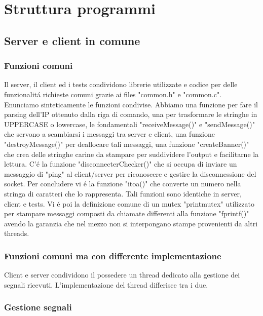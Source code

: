 \chapter{Struttura programmi}

\section{Server e client in comune}

\subsection{Funzioni comuni}

Il server, il client ed i tests condividono librerie utilizzate e codice per delle funzionalit\'a richieste comuni grazie ai files "common.h" e "common.c". 
\\
Enunciamo sinteticamente le funzioni condivise. Abbiamo una funzione per fare il parsing dell'IP ottenuto dalla riga di comando, una per trasformare le stringhe in UPPERCASE o lowercase, le fondamentali "receiveMessage()" e "sendMessage()" che servono a scambiarsi i messaggi tra server e client, una funzione "destroyMessage()" per deallocare tali messaggi, una funzione "createBanner()" che crea delle stringhe carine da stampare per suddividere l'output e facilitarne la lettura. C'\'e la funzione "disconnecterChecker()" che si occupa di inviare un messaggio di "ping" al client/server per riconoscere e gestire la disconnessione del socket. Per concludere vi \'e la funzione "itoa()" che converte un numero nella stringa di caratteri che lo rappresenta. Tali funzioni sono identiche in server, client e tests. Vi \'e poi la definizione comune di un mutex "printmutex" utilizzato per stampare messaggi composti da chiamate differenti alla funzione "fprintf()" avendo la garanzia che nel mezzo non si interpongano stampe provenienti da altri threads.
 
 \subsection{Funzioni comuni ma con differente implementazione}

 Client e server condividono il possedere un thread dedicato alla gestione dei segnali ricevuti. L'implementazione del thread differisce tra i due.
   
\subsection{Gestione segnali}

